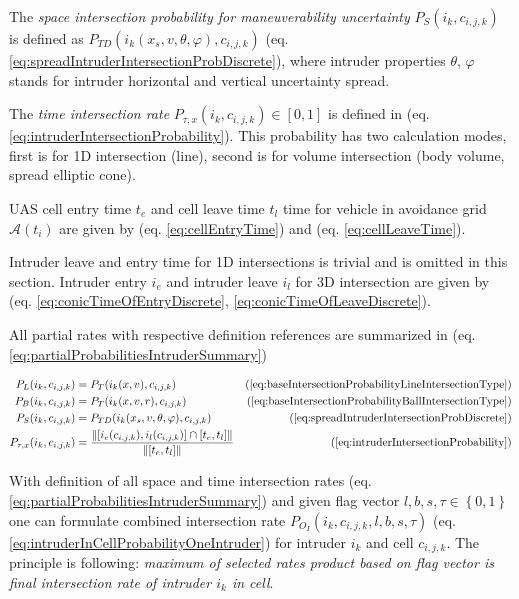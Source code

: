 The \emph{space intersection probability for maneuverability uncertainty} $P_S(i_k,c_{i,j,k})$ is defined as $P_{TD}(i_k({x}_s,{v},\theta,\varphi),c_{i,j,k})$ (eq. \ref{eq:spreadIntruderIntersectionProbDiscrete}), where intruder properties $\theta$, $\varphi$ stands for intruder horizontal and vertical uncertainty spread.

The \emph{time intersection rate} $P_{\tau,x}(i_k,c_{i,j,k})\in[0,1]$ is defined in (eq. \ref{eq:intruderIntersectionProbability}). This probability has two calculation modes, first is for 1D intersection (line), second is for volume intersection (body volume, spread elliptic cone).  

UAS cell entry time $t_e$ and cell leave time  $t_l$ time for vehicle in avoidance grid $\mathscr{A}(t_i)$ are given by (eq. \ref{eq:cellEntryTime}) and (eq. \ref{eq:cellLeaveTime}). 

Intruder leave and entry time for 1D intersections is trivial and is omitted in this section. Intruder entry $i_e$ and intruder leave $i_l$ for 3D intersection are given by (eq. \ref{eq:conicTimeOfEntryDiscrete}, \ref{eq:conicTimeOfLeaveDiscrete}). 

All partial rates with respective definition references are summarized in (eq. \ref{eq:partialProbabilitiesIntruderSummary})

\begin{equation}\label{eq:partialProbabilitiesIntruderSummary}
    \begin{aligned}
        P_L(i_k,c_{i,j,k}) &= P_T(i_k({x},{v}),c_{i,j,k}) &(\ref{eq:baseIntersectionProbabilityLineIntersectionType})\\
        P_B(i_k,c_{i,j,k}) &= P_T(i_k({x},{v},r),c_{i,j,k}) &(\ref{eq:baseIntersectionProbabilityBallIntersectionType})\\
        P_S(i_k,c_{i,j,k}) &= P_{TD}(i_k({x}_s,{v},\theta,\varphi),c_{i,j,k}) &(\ref{eq:spreadIntruderIntersectionProbDiscrete})\\
        P_{\tau,x}(i_k,c_{i,j,k})&=\frac{\left\lVert[i_e(c_{i,j,k}),i_l(c_{i,j,k})]\cap [t_e,t_l]\right\rVert}{\left\lVert[t_e,t_l]\right\rVert}& (\ref{eq:intruderIntersectionProbability})\\
    \end{aligned}
\end{equation}

\noindent With definition of all space and time intersection rates (eq. \ref{eq:partialProbabilitiesIntruderSummary}) and given flag vector $l,b,s,\tau \in\left\{0,1\right\}$ one can formulate combined intersection rate $P_{O_I}(i_k,c_{i,j,k},l,b,s,\tau)$ (eq. \ref{eq:intruderInCellProbabilityOneIntruder}) for intruder $i_k$ and cell $c_{i,j,k}$. The principle is following: \emph{maximum of selected rates product based on flag vector is final intersection rate of intruder $i_k$ in cell}. 

